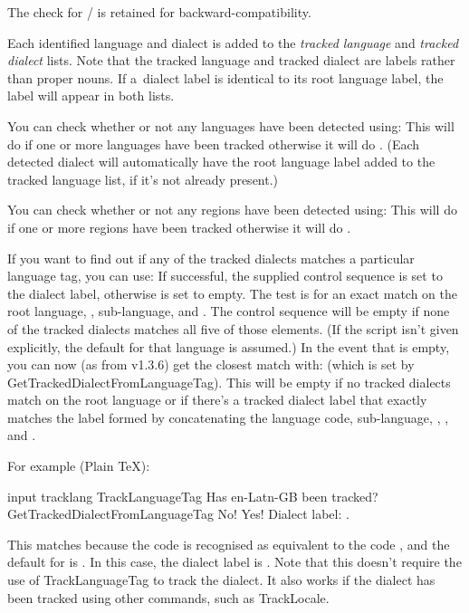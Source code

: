 \documentclass[titlepage=false,oneside,
 fontsize=12pt,captions=tableheading]{scrbook}
\newcommand{\numericcode}[1]{\glslink{opt.#1}{\glsxtrusefield{opt.#1}{numeric}}}
\begin{document}
The check for \slash{} is retained
for backward-compatibility.

Each identified language and dialect is added to the \emph{tracked
language} and \emph{tracked dialect} lists. Note that the tracked
language and tracked dialect are labels rather than proper nouns.
If a~dialect label is identical to its root language label, the
label will appear in both lists.

You can check whether or not any languages have been detected using:
This will do  if one or more languages have been
tracked otherwise it will do . (Each detected
dialect will automatically have the root language label added
to the tracked language list, if it's not already present.)

You can check whether or not any regions have been detected using:
This will do  if one or more regions have been
tracked otherwise it will do .

If you want to find out if any of the tracked dialects
matches a particular language tag, you can use:
If successful, the supplied control sequence  is set to the
dialect label, otherwise  is set to empty. The test is for an exact
match on the root language, , sub-language,  and
. The control sequence  will be empty if none of the
tracked dialects matches all five of those elements. (If the script
isn't given explicitly, the default for that language is assumed.)
In the event that  is empty, you can now (as from v1.3.6)
get the closest match with:
(which is set by \gls{GetTrackedDialectFromLanguageTag}).
This will be empty if no tracked dialects match on the root
language or if there's a tracked dialect label that exactly matches
the label formed by concatenating the language code, sub-language,
, ,  and .

For example (Plain \TeX):
\begin{codebox}
\gls{input} tracklang
\gls{TrackLanguageTag}
Has en-Latn-GB been tracked?
\gls{GetTrackedDialectFromLanguageTag}\comment{}
 No!
 Yes! Dialect label: .
\end{codebox}
This matches because the  code \numericcode{GB} is recognised as
equivalent to the code , and the default  for
 is . In this case, the dialect
label is . Note that this doesn't require
the use of \gls{TrackLanguageTag} to track the dialect. 
It also works if the dialect has been tracked using other commands,
such as \gls{TrackLocale}.
\end{document}
